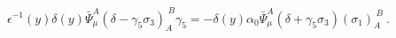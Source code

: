 \begin{equation} \label{warunkibrzegbaggergrav}
  \epsilon^{-1}(y) \delta(y) \bar{\Psi}_\mu^A(\delta-\gamma_5\sigma_3)_A^{\;B}\gamma_5=-\delta(y)\alpha_{0}\bar{\Psi}_\mu^A(\delta+\gamma_{5}\sigma_3)(\sigma_1)_A^{\;B}\ .
    \end{equation} 
